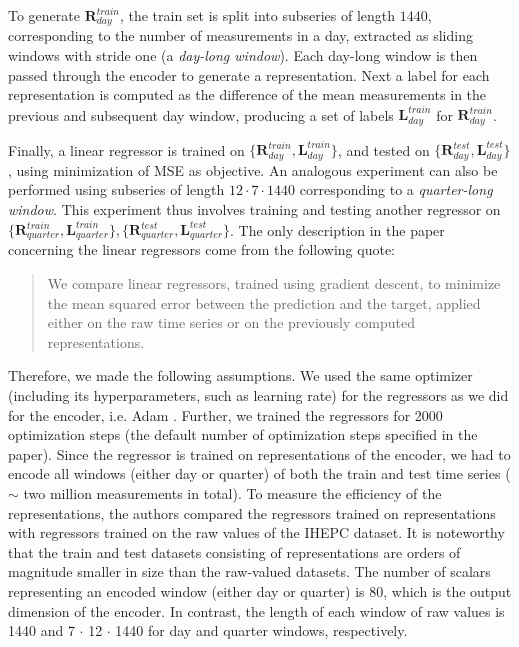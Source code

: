 To generate $\mathbf{R}_{day}^{train}$, the train set is split into subseries of length $1440$, corresponding to the number of measurements in a day, extracted as sliding windows with stride one (a \textit{day-long window}). Each day-long window is then passed through the encoder to generate a representation. Next a label for each representation is computed as the difference of the mean measurements in the previous and subsequent day window, producing a set of labels $\mathbf{L}_{day}^{train}$ for $\mathbf{R}_{day}^{train}$.


Finally, a linear regressor is trained on $\{\mathbf{R}_{day}^{train},\mathbf{L}_{day}^{train}\}$, and tested on $\{\mathbf{R}_{day}^{test},\mathbf{L}_{day}^{test}\}$, using minimization of MSE as objective. An analogous experiment can also be performed using subseries of length $12\cdot7\cdot1440$ corresponding to a \textit{quarter-long window}. This experiment thus involves training and testing another regressor on $\{\mathbf{R}_{quarter}^{train},\mathbf{L}_{quarter}^{train}\},\{\mathbf{R}_{quarter}^{test},\mathbf{L}_{quarter}^{test}\}$.
The only description in the paper concerning the linear regressors come from the following quote:
\begin{quote}
We compare linear regressors, trained using gradient descent, to minimize the mean squared error between the prediction and the target, applied either on the raw time series or on the previously computed representations.
\end{quote}
Therefore, we made the following assumptions. We used the same optimizer (including its hyperparameters, such as learning rate) for the regressors as we did for the encoder, i.e. Adam \citep{kingma2014adam}. Further, we trained the regressors for 2000 optimization steps (the default number of optimization steps specified in the paper). Since the regressor is trained on representations of the encoder, we had to encode all windows (either day or quarter) of both the train and test time series ($\sim$ two million measurements in total). To measure the efficiency of the representations, the authors compared the regressors trained on representations with regressors trained on the raw values of the IHEPC dataset. It is noteworthy that the train and test datasets consisting of representations are orders of magnitude smaller in size than the raw-valued datasets. The number of scalars representing an encoded window (either day or quarter) is 80, which is the output dimension of the encoder. In contrast, the length of each window of raw values is 1440 and 7 $\cdot$ 12 $\cdot$ 1440 for day and quarter windows, respectively. 

